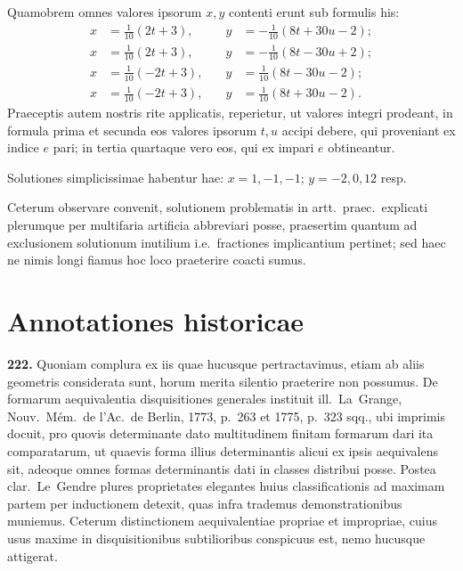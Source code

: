 \documentclass[12pt,a4paper]{article}
\theoremstyle{plain}
\theoremstyle{definition}
\theoremstyle{remark}
\begin{document}
Quamobrem omnes valores ipsorum $x,y$ contenti erunt sub formulis his:
\begin{align*}
x&=\tfrac{1}{10}(2t+3),\quad &y&=-\tfrac{1}{10}(8t+30u-2);\\
x&=\tfrac{1}{10}(2t+3),\quad &y&=-\tfrac{1}{10}(8t-30u+2);\\
x&=\tfrac{1}{10}(-2t+3),\quad &y&=\tfrac{1}{10}(8t-30u-2);\\
x&=\tfrac{1}{10}(-2t+3),\quad &y&=\tfrac{1}{10}(8t+30u-2).
\end{align*}
Praeceptis autem nostris rite applicatis, reperietur, ut valores integri prodeant, in formula prima et secunda eos valores ipsorum $t,u$ accipi debere, qui proveniant ex indice $e$ pari; in tertia quartaque vero eos, qui ex impari $e$ obtineantur.

Solutiones simplicissimae habentur hae: $x=1,-1,-1$; $y=-2,0,12$ resp.

Ceterum observare convenit, solutionem problematis in artt.\ praec.\ explicati plerumque per multifaria artificia abbreviari posse, praesertim quantum ad exclusionem solutionum inutilium i.e.\ fractiones implicantium pertinet; sed haec ne nimis longi fiamus hoc loco praeterire coacti sumus.


\section*{Annotationes historicae}

\textbf{222.}
Quoniam complura ex iis quae hucusque pertractavimus, etiam ab aliis geometris considerata sunt, horum merita silentio praeterire non possumus. De formarum aequivalentia disquisitiones generales instituit ill.~La~Grange, Nouv.\ M\'em.\ de l'Ac.\ de Berlin, 1773, p.~263 et 1775, p.~323 sqq., ubi imprimis docuit, pro quovis determinante dato multitudinem finitam formarum dari ita comparatarum, ut quaevis forma illius determinantis alicui ex ipsis aequivalens sit, adeoque omnes formas determinantis dati in classes distribui posse. Postea clar.\ Le~Gendre plures proprietates elegantes huius classificationis ad maximam partem per inductionem detexit, quas infra trademus demonstrationibus muniemus. Ceterum distinctionem aequivalentiae propriae et impropriae, cuius usus maxime in disquisitionibus subtilioribus conspicuus est, nemo hucusque attigerat.
\end{document}
